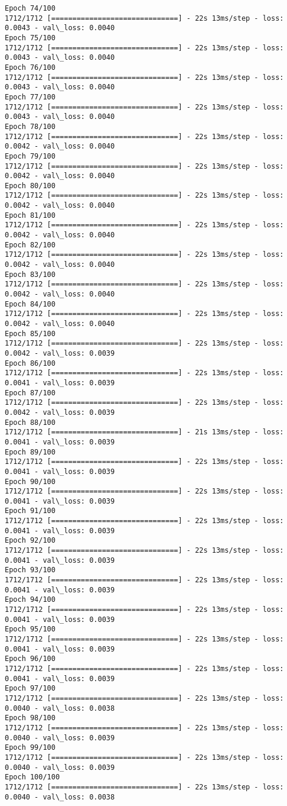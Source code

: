 \documentclass[11pt]{article}
\begin{document}
\begin{Verbatim}[commandchars=\\\{\}]
Epoch 74/100
1712/1712 [==============================] - 22s 13ms/step - loss: 0.0043 - val\_loss: 0.0040
Epoch 75/100
1712/1712 [==============================] - 22s 13ms/step - loss: 0.0043 - val\_loss: 0.0040
Epoch 76/100
1712/1712 [==============================] - 22s 13ms/step - loss: 0.0043 - val\_loss: 0.0040
Epoch 77/100
1712/1712 [==============================] - 22s 13ms/step - loss: 0.0043 - val\_loss: 0.0040
Epoch 78/100
1712/1712 [==============================] - 22s 13ms/step - loss: 0.0042 - val\_loss: 0.0040
Epoch 79/100
1712/1712 [==============================] - 22s 13ms/step - loss: 0.0042 - val\_loss: 0.0040
Epoch 80/100
1712/1712 [==============================] - 22s 13ms/step - loss: 0.0042 - val\_loss: 0.0040
Epoch 81/100
1712/1712 [==============================] - 22s 13ms/step - loss: 0.0042 - val\_loss: 0.0040
Epoch 82/100
1712/1712 [==============================] - 22s 13ms/step - loss: 0.0042 - val\_loss: 0.0040
Epoch 83/100
1712/1712 [==============================] - 22s 13ms/step - loss: 0.0042 - val\_loss: 0.0040
Epoch 84/100
1712/1712 [==============================] - 22s 13ms/step - loss: 0.0042 - val\_loss: 0.0040
Epoch 85/100
1712/1712 [==============================] - 22s 13ms/step - loss: 0.0042 - val\_loss: 0.0039
Epoch 86/100
1712/1712 [==============================] - 22s 13ms/step - loss: 0.0041 - val\_loss: 0.0039
Epoch 87/100
1712/1712 [==============================] - 22s 13ms/step - loss: 0.0042 - val\_loss: 0.0039
Epoch 88/100
1712/1712 [==============================] - 21s 13ms/step - loss: 0.0041 - val\_loss: 0.0039
Epoch 89/100
1712/1712 [==============================] - 22s 13ms/step - loss: 0.0041 - val\_loss: 0.0039
Epoch 90/100
1712/1712 [==============================] - 22s 13ms/step - loss: 0.0041 - val\_loss: 0.0039
Epoch 91/100
1712/1712 [==============================] - 22s 13ms/step - loss: 0.0041 - val\_loss: 0.0039
Epoch 92/100
1712/1712 [==============================] - 22s 13ms/step - loss: 0.0041 - val\_loss: 0.0039
Epoch 93/100
1712/1712 [==============================] - 22s 13ms/step - loss: 0.0041 - val\_loss: 0.0039
Epoch 94/100
1712/1712 [==============================] - 22s 13ms/step - loss: 0.0041 - val\_loss: 0.0039
Epoch 95/100
1712/1712 [==============================] - 22s 13ms/step - loss: 0.0041 - val\_loss: 0.0039
Epoch 96/100
1712/1712 [==============================] - 22s 13ms/step - loss: 0.0041 - val\_loss: 0.0039
Epoch 97/100
1712/1712 [==============================] - 22s 13ms/step - loss: 0.0040 - val\_loss: 0.0038
Epoch 98/100
1712/1712 [==============================] - 22s 13ms/step - loss: 0.0040 - val\_loss: 0.0039
Epoch 99/100
1712/1712 [==============================] - 22s 13ms/step - loss: 0.0040 - val\_loss: 0.0039
Epoch 100/100
1712/1712 [==============================] - 22s 13ms/step - loss: 0.0040 - val\_loss: 0.0038

    \end{Verbatim}
\end{document}
